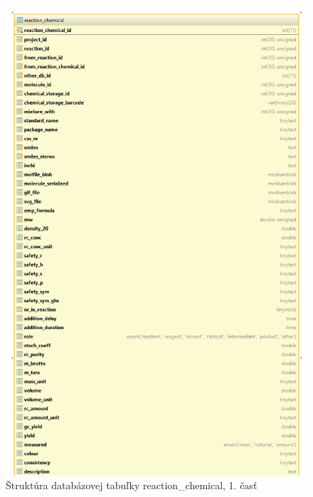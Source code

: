 \documentclass[thesis=M,slovak]{FITthesis}[2013/05/06]
\begin{document}
\begin{figure}\centering
	\includegraphics[width=1.0\textwidth]{Schema_DB_Open_Enventory/reaction_chemical_1.png}
 	\caption[Štruktúra databázovej tabuľky reaction\_chemical, 1. časť]{Štruktúra databázovej tabuľky reaction\_chemical, 1. časť}\label{graphics:reactionChemical1}
\end{figure}
\end{document}
